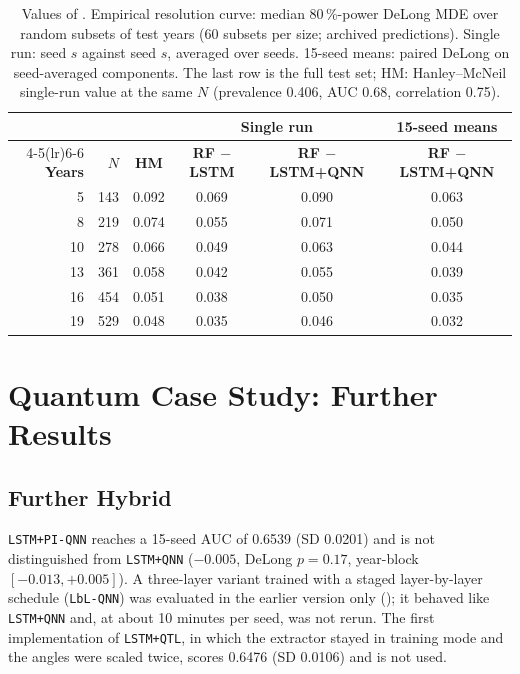 \documentclass[11pt,a4paper]{article}
\begin{document}
\begin{table}[htbp]
\centering
\caption{Values of . Empirical resolution curve: median 80\,\%-power DeLong MDE over random subsets of test years (60 subsets per size; archived predictions). Single run: seed $s$ against seed $s$, averaged over seeds. 15-seed means: paired DeLong on seed-averaged components. The last row is the full test set; HM: Hanley--McNeil single-run value at the same $N$ (prevalence 0.406, AUC 0.68, correlation 0.75).}
\label{tab:resolution}
{\small
\begin{tabular}{rrcccc}
\toprule
& & & \multicolumn{2}{c}{\textbf{Single run}} & \textbf{15-seed means} \\
\cmidrule(lr){4-5}\cmidrule(lr){6-6}
\textbf{Years} & $N$ & \textbf{HM} & \textbf{RF $-$ LSTM} & \textbf{RF $-$ LSTM+QNN} & \textbf{RF $-$ LSTM+QNN} \\
\midrule
5 & 143 & 0.092 & 0.069 & 0.090 & 0.063 \\
8 & 219 & 0.074 & 0.055 & 0.071 & 0.050 \\
10 & 278 & 0.066 & 0.049 & 0.063 & 0.044 \\
13 & 361 & 0.058 & 0.042 & 0.055 & 0.039 \\
16 & 454 & 0.051 & 0.038 & 0.050 & 0.035 \\
19 & 529 & 0.048 & 0.035 & 0.046 & 0.032 \\
\bottomrule
\end{tabular}%
}
\end{table}

\section{Quantum Case Study: Further Results}
\label{app:qml}

\subsection{Further Hybrid}
\label{app:hybrids}

\texttt{LSTM+PI-QNN} reaches a 15-seed AUC of 0.6539 (SD 0.0201) and is not distinguished from \texttt{LSTM+QNN} ($-0.005$, DeLong $p=0.17$, year-block $[-0.013,+0.005]$). A three-layer variant trained with a staged layer-by-layer schedule (\texttt{LbL-QNN}) was evaluated in the earlier version only (); it behaved like \texttt{LSTM+QNN} and, at about 10 minutes per seed, was not rerun. The first implementation of \texttt{LSTM+QTL}, in which the extractor stayed in training mode and the angles were scaled twice, scores 0.6476 (SD 0.0106) and is not used.
\end{document}
